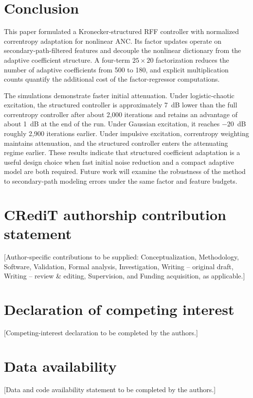 \documentclass[preprint,12pt]{elsarticle}
\begin{document}
\section{Conclusion}\label{sec:concl}

This paper formulated a Kronecker-structured RFF controller with normalized correntropy adaptation for nonlinear ANC. Its factor updates operate on secondary-path-filtered features and decouple the nonlinear dictionary from the adaptive coefficient structure. A four-term $25 \times 20$ factorization reduces the number of adaptive coefficients from 500 to 180, and explicit multiplication counts quantify the additional cost of the factor-regressor computations.

The simulations demonstrate faster initial attenuation. Under logistic-chaotic excitation, the structured controller is approximately 7~dB lower than the full correntropy controller after about 2,000 iterations and retains an advantage of about 1~dB at the end of the run. Under Gaussian excitation, it reaches $-20$~dB roughly 2,900 iterations earlier. Under impulsive excitation, correntropy weighting maintains attenuation, and the structured controller enters the attenuating regime earlier. These results indicate that structured coefficient adaptation is a useful design choice when fast initial noise reduction and a compact adaptive model are both required. Future work will examine the robustness of the method to secondary-path modeling errors under the same factor and feature budgets.

\section*{CRediT authorship contribution statement}
[Author-specific contributions to be supplied: Conceptualization, Methodology, Software, Validation, Formal analysis, Investigation, Writing -- original draft, Writing -- review \& editing, Supervision, and Funding acquisition, as applicable.]

\section*{Declaration of competing interest}
[Competing-interest declaration to be completed by the authors.]

\section*{Data availability}
[Data and code availability statement to be completed by the authors.]
\end{document}
